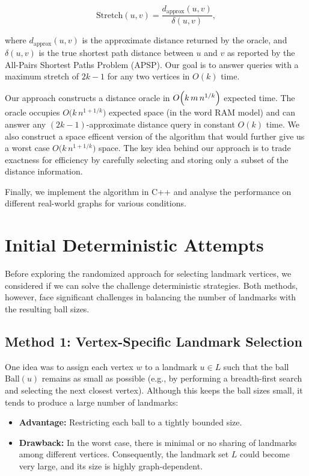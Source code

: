 \documentclass{article}
\begin{document}
\[
\text{Stretch}(u, v) = \frac{d_{\text{approx}}(u, v)}{\delta(u, v)},
\]

where \(d_{\text{approx}}(u, v)\) is the approximate distance returned by the oracle, and \(\delta(u, v)\) is the true shortest path distance between \(u\) and \(v\) {as reported by the All-Pairs Shortest Paths Problem (APSP)}. Our goal is to answer queries with a maximum stretch of \(2k - 1\) for any two vertices in \(O(k)\) time.

Our approach constructs a distance oracle in \(O\Bigl(k \, m \, n^{1/k}\Bigr)\) expected time. The oracle occupies \(O\bigl(k\,n^{1+1/k}\bigr)\) expected space (in the word RAM model) and can answer any \((2k-1)\)-approximate distance query in constant \(O(k)\) time. We also construct a space efficent version of the algorithm that would further give us a worst case \(O\bigl(k\,n^{1+1/k}\bigr)\) space. The key idea behind our approach is to trade exactness for efficiency by carefully selecting and storing only a subset of the distance information.

Finally, we implement the algorithm in C++ and analyse the performance on different real-world graphs for various conditions.

\section{Initial Deterministic Attempts}

Before exploring the randomized approach for selecting landmark vertices, we considered if we can solve the challenge deterministic strategies. Both methods, however, face significant challenges in balancing the number of landmarks with the resulting ball sizes.

\subsection{Method 1: Vertex-Specific Landmark Selection}

One idea was to assign each vertex \(w\) to a landmark \(u \in L\) such that the ball \(\text{Ball}(u)\) remains as small as possible (e.g., by performing a breadth-first search and selecting the next closest vertex). Although this keeps the ball sizes small, it tends to produce a large number of landmarks:
\begin{itemize}
    \item \textbf{Advantage:} Restricting each ball to a tightly bounded size.
    \item \textbf{Drawback:} In the worst case, there is minimal or no sharing of landmarks among different vertices. Consequently, the landmark set \(L\) could become very large, and its size is highly graph-dependent. 
\end{itemize}
\end{document}
